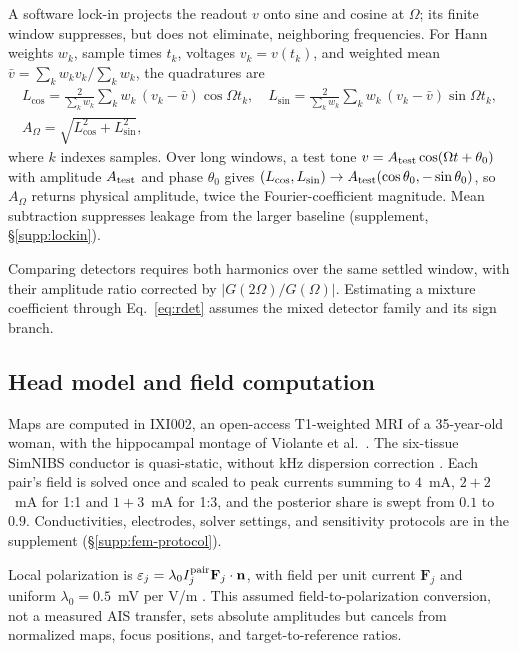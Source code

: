 A software lock-in projects the readout $v$ onto sine and cosine at $\Omega$; its
finite window suppresses, but does not eliminate, neighboring frequencies. For Hann
weights $w_k$, sample times $t_k$, voltages $v_k=v(t_k)$, and weighted mean
$\bar v=\sum_k w_kv_k/\sum_k w_k$, the quadratures are
\begin{equation}
\begin{gathered}
L_{\cos}=\frac{2}{\sum_k w_k}\sum_k w_k\,(v_k-\bar v)\cos\Omega t_k,\quad
L_{\sin}=\frac{2}{\sum_k w_k}\sum_k w_k\,(v_k-\bar v)\sin\Omega t_k,\\
A_\Omega=\sqrt{L_{\cos}^2+L_{\sin}^2},
\end{gathered}
\label{eq:lockin}
\end{equation}
where $k$ indexes samples. Over long windows, a test tone
$v=A_{\rm test}\cos(\Omega t+\theta_0)$ with amplitude $A_{\rm test}$
and phase $\theta_0$ gives
$(L_{\cos},L_{\sin})\to A_{\rm test}(\cos\theta_0,-\sin\theta_0)$,
so $A_\Omega$ returns physical amplitude, twice the Fourier-coefficient magnitude.
Mean subtraction suppresses leakage from the larger baseline (supplement,
\S\ref{supp:lockin}).

\ifjne\else

\fi

Comparing detectors requires both harmonics over the same settled window, with their
amplitude ratio corrected by $|G(2\Omega)/G(\Omega)|$. Estimating a mixture coefficient
through Eq.~\eqref{eq:rdet} assumes the mixed detector family and its sign branch.

\subsection{Head model and field computation}\label{sec:fem-methods}
\ifjne
Maps are computed in IXI002, an open-access T1-weighted MRI of a 35-year-old
woman, with the hippocampal montage of Violante et al.\ \cite{violante2023}.
The six-tissue SimNIBS conductor is quasi-static, without kHz dispersion correction
\cite{salvador2025}. Each pair's field is solved once and scaled to peak currents
summing to $4$~mA, $2+2$~mA for 1:1 and $1+3$~mA for 1:3, and the posterior share is
swept from $0.1$ to $0.9$. Conductivities, electrodes, solver settings, and sensitivity
protocols are in the supplement (\S\ref{supp:fem-protocol}).

Local polarization is $\varepsilon_j=\lambda_0 I_j^{\rm pair}\mathbf F_j\cdot\mathbf n$,
with field per unit current $\mathbf F_j$ and uniform $\lambda_0=0.5$~mV per V/m
\cite{radman2009}. This assumed field-to-polarization conversion, not a measured AIS
transfer, sets absolute amplitudes but cancels from normalized maps, focus positions,
and target-to-reference ratios.

